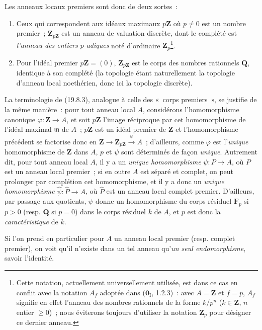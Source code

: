 Les anneaux locaux premiers sont donc de deux sortes~:
\begin{enumerate}
  \item[$1^{\mathrm o}$] Ceux qui correspondent aux idéaux maximaux
  $p\mathbf Z$ où $p\neq0$ est un nombre premier~; $\mathbf Z_{p\mathbf Z}$
  est un anneau de valuation discrète, dont le complété est \emph{l'anneau des
  entiers $p$-adiques} noté d'ordinaire $\mathbf Z_p$\footnote{Cette notation,
  actuellement universellement utilisée, est dans ce cas en conflit avec la
  notation $A_f$ adoptée dans ($\mathbf 0_{\mathrm I}$, 1.2.3)~: avec
  $A=\mathbf Z$ et $f=p$, $A_f$ signifie en effet l'anneau des nombres
  rationnels de la forme $k/p^n$ ($k\in\mathbf Z$, $n$ entier $\geq0$)~; nous
  éviterons toujours d'utiliser la notation $\mathbf Z_p$ pour désigner ce
  dernier anneau.}.
  \item[$2^{\mathrm o}$] Pour l'idéal premier $p\mathbf Z=(0)$,
  $\mathbf Z_{p\mathbf Z}$ est le corps des nombres rationnels $\mathbf Q$,
  identique à son complété (la topologie étant naturellement la topologie
  d'anneau local noethérien, donc ici la topologie discrète).
\end{enumerate}

La terminologie de (19.8.3), analogue à celle des «~corps premiers~», se
justifie de la même manière~: pour tout anneau local $A$, considérons
l'homomorphisme canonique $\varphi:\mathbf Z\to A$, et soit $p\mathbf Z$
l'image réciproque par cet homomorphisme de l'idéal maximal $\mathfrak m$ de
$A$~; $p\mathbf Z$ est un idéal premier de $\mathbf Z$ et l'homomorphisme
précédent se factorise donc en
$\mathbf Z\to\mathbf Z_{p\mathbf Z}\xrightarrow{\psi}A$~; d'ailleurs, comme
$\varphi$ est l'\emph{unique} homomorphisme de $\mathbf Z$ dans $A$, $p$ et
$\psi$ sont déterminés de façon \emph{unique}. Autrement dit, pour tout anneau
local $A$, il y a un \emph{unique homomorphisme} $\psi:P\to A$, où $P$ est un
anneau local premier~; si en outre $A$ est séparé et complet, on peut prolonger
par complétion cet homomorphisme, et il y a donc un \emph{unique
homomorphisme} $\widehat\psi:\widehat P\to A$, où $\widehat P$ est un anneau
local complet premier. D'ailleurs, par passage aux quotients, $\psi$ donne un
homomorphisme du corps résiduel $\mathbf F_p$ si $p>0$ (resp. $\mathbf Q$ si
$p=0$) dans le corps résiduel $k$ de $A$, et $p$ est donc la
\emph{caractéristique} de $k$.

Si l'on prend en particulier pour $A$ un anneau local premier (resp. complet
premier), on voit qu'il n'existe dans un tel anneau qu'\emph{un seul
endomorphisme}, savoir l'identité.
